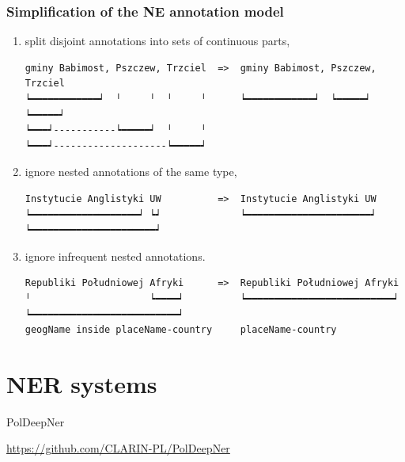 \documentclass[Warsaw]{beamer}
\begin{document}
\begin{frame}[fragile]
    \frametitle{Simplification of the NE annotation model}
    
    \begin{enumerate}
        \item split disjoint annotations into sets of continuous parts,
        {\scriptsize
        \begin{verbatim}
gminy Babimost, Pszczew, Trzciel  =>  gminy Babimost, Pszczew, Trzciel
┕━━━━━━━━━━━━┙  ╵     ╵  ╵     ╵      ┕━━━━━━━━━━━━┙  ┕━━━━━┙  ┕━━━━━┙
┕━━━┙-----------┕━━━━━┙  ╵     ╵    
┕━━━┙--------------------┕━━━━━┙      
        \end{verbatim}
        }

        \item ignore nested annotations of the same type,
        {\scriptsize
        \begin{verbatim}
Instytucie Anglistyki UW          =>  Instytucie Anglistyki UW
┕━━━━━━━━━━━━━━━━━━━┙ ┕┙              ┕━━━━━━━━━━━━━━━━━━━━━━┙
┕━━━━━━━━━━━━━━━━━━━━━━┙
        \end{verbatim}
        }
        
        \item ignore infrequent nested annotations.
        {\scriptsize
        \begin{verbatim}
Republiki Południowej Afryki      =>  Republiki Południowej Afryki
╵                     ┕━━━━┙          ┕━━━━━━━━━━━━━━━━━━━━━━━━━━┙
┕━━━━━━━━━━━━━━━━━━━━━━━━━━┙
geogName inside placeName-country     placeName-country
        \end{verbatim}
        }
    \end{enumerate}
    
\end{frame}

\section{NER systems}

\begin{frame}
    \begin{center}
        \Huge
        PolDeepNer
        
        \normalsize
        \url{https://github.com/CLARIN-PL/PolDeepNer}
    \end{center}
\end{frame}
\end{document}
